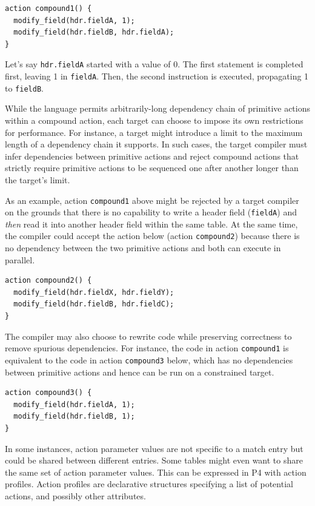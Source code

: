 \documentclass[12pt]{article}
\begin{document}
\begin{lstlisting}[style=P4style]
action compound1() {
  modify_field(hdr.fieldA, 1);
  modify_field(hdr.fieldB, hdr.fieldA);
}
\end{lstlisting}

Let's say \texttt{hdr.fieldA} started with a value of 0. The first statement is
completed first, leaving 1 in \texttt{fieldA}. Then, the second instruction is
executed, propagating 1 to \texttt{fieldB}.

While the language permits arbitrarily-long dependency chain of primitive actions
within a compound action, each target can choose to impose its own restrictions
for performance. For instance, a target might introduce a limit to the maximum 
length of a dependency chain it supports. In such cases, the target
compiler must infer dependencies between primitive actions and reject
compound actions that strictly require primitive actions to be sequenced one after
another longer than the target's limit.

As an example, action \texttt{compound1} above might be 
rejected by a target compiler on the grounds that there is no capability to write 
a header field (\texttt{fieldA}) and \textit{then} read it into another header field
within the same table. At the same time, the compiler could accept the action below 
(action \texttt{compound2}) because there is no dependency between the two primitive 
actions and both can execute in parallel.

\begin{lstlisting}[style=P4style]
action compound2() {
  modify_field(hdr.fieldX, hdr.fieldY);
  modify_field(hdr.fieldB, hdr.fieldC);
}
\end{lstlisting}

The compiler may also choose to rewrite code while preserving correctness to
remove spurious dependencies. For instance, the code in action \texttt{compound1} 
is equivalent to the code in action \texttt{compound3} below, which has no 
dependencies between primitive actions and hence can be run on a constrained target.

\begin{lstlisting}[style=P4style]
action compound3() {
  modify_field(hdr.fieldA, 1);
  modify_field(hdr.fieldB, 1);
}
\end{lstlisting}


In some instances, action parameter values are not specific to a match entry but
could be shared between different entries. Some tables might even want to share
the same set of action parameter values. This can be expressed in P4 with
action profiles. Action profiles are declarative structures specifying a list 
of potential actions, and possibly other attributes.
\end{document}
